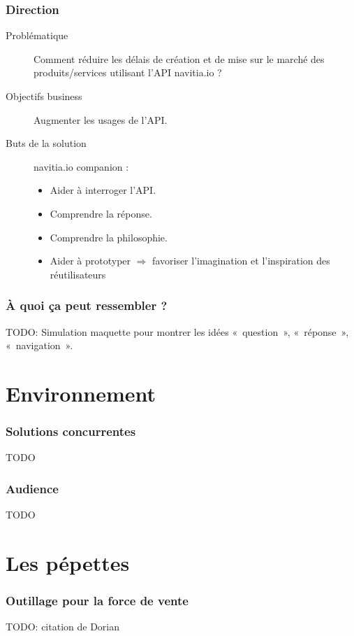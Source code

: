\documentclass[table]{beamer}
\begin{document}
\begin{frame}
  \frametitle{Direction}

  \begin{description}
  \item[Problématique] Comment réduire les délais de création et de
    mise sur le marché des produits/services utilisant l'API
    navitia.io ?
  \item[Objectifs business] Augmenter les usages de l'API.
  \item[Buts de la solution] navitia.io companion :
    \begin{itemize}
    \item Aider à interroger l'API.
    \item Comprendre la réponse.
    \item Comprendre la philosophie.
    \item Aider à prototyper $\Rightarrow$ favoriser l'imagination et
      l'inspiration des réutilisateurs
    \end{itemize}
  \end{description}
\end{frame}

\begin{frame}
  \frametitle{À quoi ça peut ressembler ?}

  TODO: Simulation maquette pour montrer les idées «~question~»,
  «~réponse~», «~navigation~».
\end{frame}

\section{Environnement}

\begin{frame}
  \frametitle{Solutions concurrentes}

  TODO
\end{frame}

\begin{frame}
  \frametitle{Audience}

  TODO
\end{frame}

\section{Les pépettes}

\begin{frame}
  \frametitle{Outillage pour la force de vente}

  TODO: citation de Dorian
\end{frame}
\end{document}

